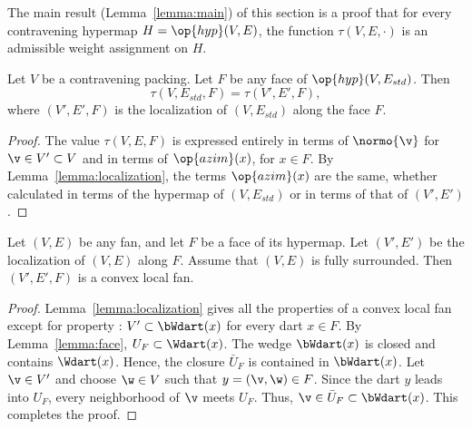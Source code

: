The main result (Lemma~\ref{lemma:main}) of this section is a proof
that for every contravening hypermap $H=\op{hyp}(V,E)$, the function
$\tau(V,E,\cdot)$ is an admissible weight assignment on $H$.



\begin{lemma}[]  \label{lemma:tau-local}
  Let $V$ be a contravening packing.
  Let $F$ be any face of $\op{hyp}(V,E_{std})$.  Then
\begin{displaymath}
\tau(V,E_{std},F) = \tau(V',E',F),
\end{displaymath}
where $(V',E',F)$ is the localization of $(V,E_{std})$ along the face $F$.
\end{lemma}

\begin{proof} The value $\tau(V,E,F)$ is expressed entirely in terms
  of $\normo{\v}$ for $\v\in V'\subset V$ and in terms of
  $\op{azim}(x)$, for $x\in F$.  By Lemma~\ref{lemma:localization},
  the terms $\op{azim}(x)$ are the same, whether calculated in terms
  of the hypermap of $(V,E_{std})$ or in terms of that of $(V',E')$.
\end{proof}


\begin{lemma}[] Let $(V,E)$ be any fan, and
  let $F$ be a face of its hypermap.  Let $(V',E')$ be the
  localization of $(V,E)$ along $F$.  Assume that $(V,E)$ is fully surrounded.
  Then $(V',E',F)$ is a convex local fan.
\end{lemma}

\begin{proof}
  Lemma~\ref{lemma:localization} gives all the properties of a convex local fan except for property : $V'\subset \bWdart(x)$ for
  every dart $x\in F$.  By Lemma~\ref{lemma:face}, $U_F \subset
  \Wdart(x)$.  The wedge $\bWdart(x)$ is closed and contains
  $\Wdart(x)$. Hence, the closure $\bar U_F$ is contained in
  $\bWdart(x)$.  Let $\v\in V'$ and choose $\w\in V$ such that
  $y=(\v,\w)\in F$.
  Since the dart $y$ leads into $U_F$, every neighborhood of $\v$
  meets $U_F$.  Thus, $\v\in \bar U_F\subset \bWdart(x)$.  This
  completes the proof.
\end{proof}








%



